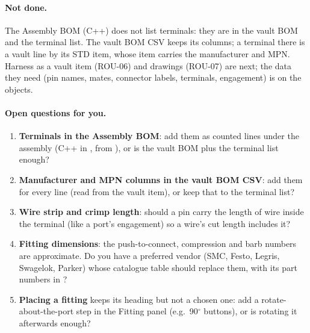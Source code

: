 \paragraph{Not done.} The Assembly BOM (C++) does not list terminals: they are in the vault BOM and the terminal
list. The vault BOM CSV keeps its columns; a terminal there is a vault line by its STD item, whose item carries the
manufacturer and MPN. Harness as a vault item (ROU-06) and drawings (ROU-07) are next; the data they need (pin
names, mates, connector labels, terminals, engagement) is on the objects.

\paragraph{Open questions for you.}
\begin{enumerate}[nosep]
  \item \textbf{Terminals in the Assembly BOM}: add them as counted lines under the assembly (C++ in
        , from ), or is the vault BOM plus the terminal list enough?
  \item \textbf{Manufacturer and MPN columns in the vault BOM CSV}: add them for every line (read from the vault
        item), or keep that to the terminal list?
  \item \textbf{Wire strip and crimp length}: should a pin carry the length of wire inside the terminal (like a
        port's engagement) so a wire's cut length includes it?
  \item \textbf{Fitting dimensions}: the push-to-connect, compression and barb numbers are approximate. Do you have
        a preferred vendor (SMC, Festo, Legris, Swagelok, Parker) whose catalogue table should replace them, with its
        part numbers in ?
  \item \textbf{Placing a fitting} keeps its heading but not a chosen one: add a rotate-about-the-port step in the
        Fitting panel (e.g.\ 90$^\circ$ buttons), or is rotating it afterwards enough?
\end{enumerate}

